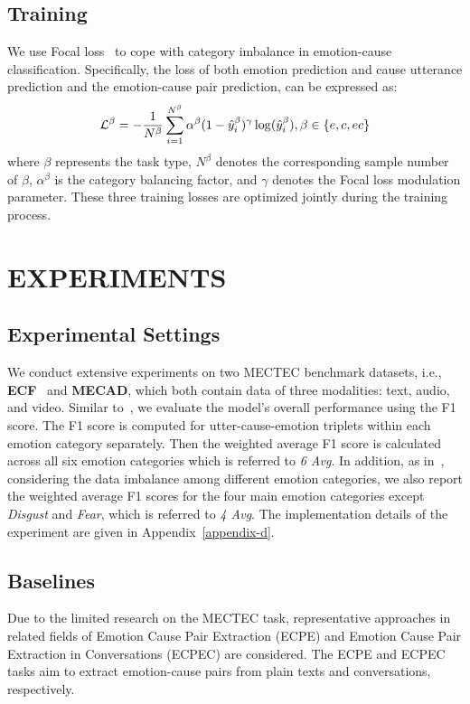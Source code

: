 \documentclass[11pt]{article}
\begin{document}
\subsection{Training}
We use Focal loss~\cite{ross2017focal} to cope with category imbalance in emotion-cause classification.
Specifically, the loss of both emotion prediction and cause utterance prediction and the emotion-cause pair prediction, can be expressed as:
\begin{equation}
    \mathcal{L}^\beta = -\frac{1}{N^\beta} \sum_{i=1}^{N^\beta} \alpha^\beta (1 - \hat{y}_i^\beta)^\gamma \log(\hat{y}_i^\beta),\\
    \beta \in \{e, c, ec\}
\end{equation}
where $\beta$ represents the task type, $N^\beta$ denotes the corresponding sample number of $\beta$, $\alpha^\beta$ is the category balancing factor, and $\gamma$ denotes the Focal loss modulation parameter.
These three training losses are optimized jointly during the training process.
\section{EXPERIMENTS}
\subsection{Experimental Settings}
We conduct extensive experiments on two MECTEC benchmark datasets, i.e., \textbf{ECF}~\cite{ecf} and \textbf{MECAD}, which both contain data of three modalities: text, audio, and video.
Similar to~\cite{ecf}, we evaluate the model's overall performance using the F1 score.
The F1 score is computed for utter-cause-emotion triplets within each emotion category separately.
Then the weighted average F1 score is calculated across all six emotion categories which is referred to \textit{6 Avg}.
In addition, as in~\cite{wang2023generative}, considering the data imbalance among different emotion categories, we also report the weighted average F1 scores for the four main emotion categories except \textit{Disgust} and \textit{Fear}, which is referred to \textit{4 Avg}. 
The implementation details of the experiment are given in Appendix~\ref{appendix-d}.

\subsection{Baselines}
Due to the limited research on the MECTEC task, representative approaches in related fields of Emotion Cause Pair Extraction (ECPE) and Emotion Cause Pair Extraction in Conversations (ECPEC) are considered.
The ECPE and ECPEC tasks aim to extract emotion-cause pairs from plain texts and conversations, respectively.
\end{document}
